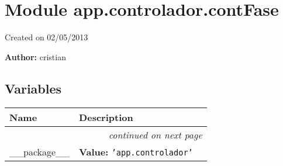 %
%
%


\section{Module app.controlador.contFase}

    \label{app:controlador:contFase}
Created on 02/05/2013

\textbf{Author:} cristian





  \subsection{Variables}

    \vspace{-1cm}
\hspace{\varindent}\begin{longtable}{|p{\varnamewidth}|p{\vardescrwidth}|l}
\cline{1-2}
\cline{1-2} \centering \textbf{Name} & \centering \textbf{Description}& \\
\cline{1-2}
\endhead\cline{1-2}\multicolumn{3}{r}{\small\textit{continued on next page}}\\\endfoot\cline{1-2}
\endlastfoot\raggedright \_\-\_\-p\-a\-c\-k\-a\-g\-e\-\_\-\_\- & \raggedright \textbf{Value:} 
{\tt \texttt{'}\texttt{app.controlador}\texttt{'}}&\\
\cline{1-2}
\end{longtable}



